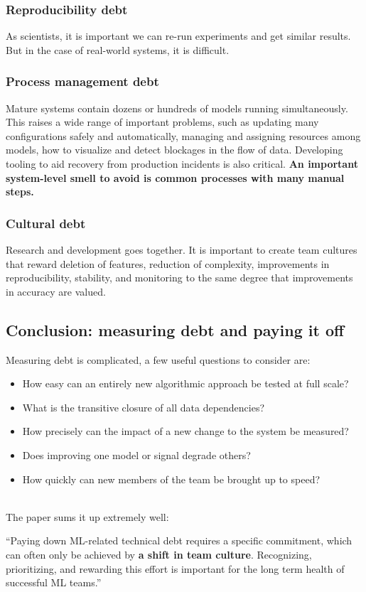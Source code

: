 \documentclass[../main.tex]{subfiles}
\begin{document}
\subsubsection{Reproducibility debt}
As scientists, it is important we can re-run experiments and get similar results. But in the case
of real-world systems, it is difficult.

\subsubsection{Process management debt}
Mature systems contain dozens or hundreds of models running simultaneously. This raises a wide range
of important problems, such as updating many configurations safely and automatically, managing and assigning
resources among models, how to visualize and detect blockages in the flow of data. Developing tooling
to aid recovery from production incidents is also critical. \textbf{An important system-level smell
to avoid is common processes with many manual steps.}

\subsubsection{Cultural debt}
Research and development goes together. It is important to create team cultures that reward deletion
of features, reduction of complexity, improvements in reproducibility, stability, and monitoring to the
same degree that improvements in accuracy are valued.

\subsection{Conclusion: measuring debt and paying it off}
Measuring debt is complicated, a few useful questions to consider are:
\begin{itemize}
    \item How easy can an entirely new algorithmic approach be tested at full scale?
    \item What is the transitive closure of all data dependencies?
    \item How precisely can the impact of a new change to the system be measured?
    \item Does improving one model or signal degrade others?
    \item How quickly can new members of the team be brought up to speed?
\end{itemize}
\\

The paper sums it up extremely well:
\begin{displayquote}
    \enquote{Paying down ML-related technical debt requires a specific commitment, which can often only
        be achieved by \textbf{a shift in team culture}. Recognizing, prioritizing, and rewarding this
        effort is important for the long term health of successful ML teams.}
\end{displayquote}
\end{document}
